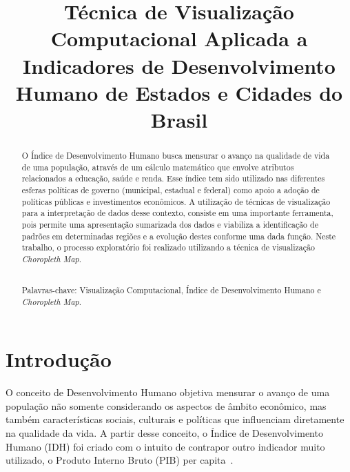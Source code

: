 \documentclass[conference]{IEEEtran}
\begin{document}
\renewcommand{\abstractname}{Resumo}
\renewcommand{\tablename}{TABELA}


\title{Técnica de Visualização Computacional Aplicada a Indicadores de Desenvolvimento Humano de Estados e Cidades do Brasil}


\author{
}



\maketitle

\begin{abstract}

O Índice de Desenvolvimento Humano busca mensurar o avanço na qualidade de vida de uma população, através de um cálculo matemático que envolve atributos relacionados a educação, saúde e renda. Esse índice tem sido utilizado nas diferentes esferas políticas de governo (municipal, estadual e federal) como apoio a adoção de políticas públicas e investimentos econômicos. A utilização de técnicas de visualização para a interpretação de dados desse contexto, consiste em uma importante ferramenta, pois permite uma apresentação sumarizada dos dados e viabiliza a identificação de padrões em determinadas regiões e a evolução destes conforme uma dada função. Neste trabalho, o processo exploratório foi realizado utilizando a técnica de visualização \textit{Choropleth Map}.

~\\Palavras-chave: Visualização Computacional, Índice de Desenvolvimento Humano e \textit{Choropleth Map}.

\end{abstract}


\IEEEpeerreviewmaketitle


\section{Introdução}
O conceito de Desenvolvimento Humano objetiva mensurar o avanço de uma população não somente considerando os aspectos de âmbito econômico, mas também características sociais, culturais e políticas que influenciam diretamente na qualidade da vida. A partir desse conceito, o Índice de Desenvolvimento Humano (IDH) foi criado com o intuito de contrapor outro indicador muito utilizado, o Produto Interno Bruto (PIB) per capita~\cite{atlas}.
\end{document}

